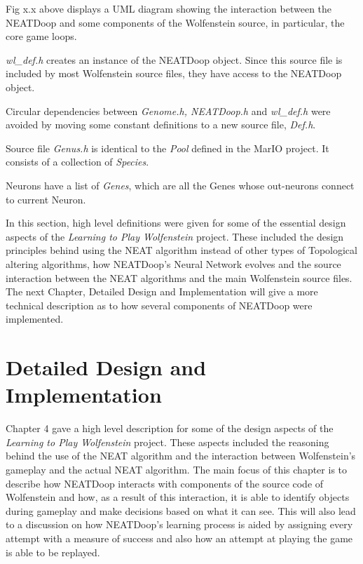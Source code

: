 \documentclass[]{Learning-to-Play-Wolfenstein-thesis}
\begin{document}
Fig x.x above displays a UML diagram showing the interaction between the NEATDoop and some components of the Wolfenstein source, in particular, the core game loops. 

\textit{wl\_def.h} creates an instance of the NEATDoop object. Since this source file is included by most Wolfenstein source files, they have access to the NEATDoop object.

Circular dependencies between \textit{Genome.h, NEATDoop.h} and \textit{wl\_def.h} were avoided by moving some constant definitions to a new source file, \textit{Def.h}.

Source file \textit{Genus.h} is identical to the \textit{Pool} defined in the MarIO project. It consists of a collection of \textit{Species}.

Neurons have a list of \textit{Genes}, which are all the Genes whose out-neurons connect to current Neuron.

In this section, high level definitions were given for some of the essential design aspects of the \textit{Learning to Play Wolfenstein} project. These included the design principles behind using the NEAT algorithm instead of other types of Topological altering algorithms, how NEATDoop's Neural Network evolves and the source interaction between the NEAT algorithms and the main Wolfenstein source files. The next Chapter, Detailed Design and Implementation will give a more technical description as to how several components of NEATDoop were implemented. 

\chapter{\label{Chapter5}Detailed Design and Implementation}%
Chapter 4 gave a high level description for some of the design aspects of the \textit{Learning to Play Wolfenstein} project. These aspects included the reasoning behind the use of the NEAT algorithm and the interaction between Wolfenstein's gameplay and the actual NEAT algorithm. The main focus of this chapter is to describe how NEATDoop interacts with components of the source code of Wolfenstein and how, as a result of this interaction, it is able to identify objects during gameplay and make decisions based on what it can see. This will also lead to a discussion on how NEATDoop's learning process is aided by assigning every attempt with a measure of success and also how an attempt at playing the game is able to be replayed. 
\end{document}
